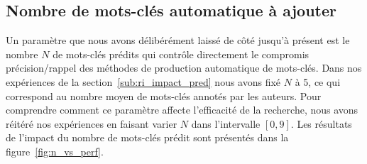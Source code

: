 
\subsection{Nombre de mots-clés automatique à ajouter}

Un paramètre que nous avons délibérément laissé de côté jusqu'à présent est le nombre $N$ de mots-clés prédits qui contrôle directement le compromis précision/rappel des méthodes de production automatique de mots-clés.
Dans nos expériences de la section~\ref{sub:ri_impact_pred} nous avons fixé $N$ à 5, ce qui correspond au nombre moyen de mots-clés annotés par les auteurs.
Pour comprendre comment ce paramètre affecte l'efficacité de la recherche, nous avons réitéré nos expériences en faisant varier $N$ dans l'intervalle $[0,9]$. Les résultats de l'impact du nombre de mots-clés prédit sont présentés  dans la figure~\ref{fig:n_vs_perf}.






